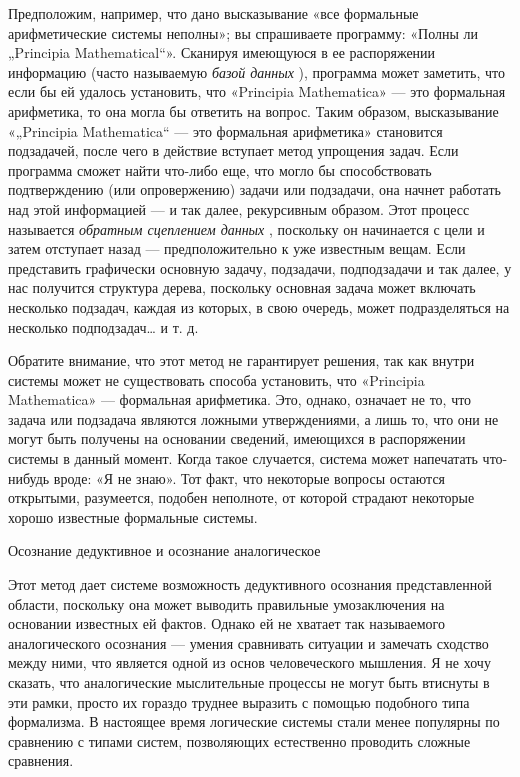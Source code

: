 Предположим, например, что дано высказывание «все формальные арифметические системы неполны»; вы спрашиваете программу: «Полны ли „Principia Mathematical``». Сканируя имеющуюся в ее распоряжении информацию (часто называемую \emph{базой данных} ), программа может заметить, что если бы ей удалось установить, что «Principia Mathematica» --- это формальная арифметика, то она могла бы ответить на вопрос. Таким образом, высказывание «„Principia Mathematica`` --- это формальная арифметика» становится подзадачей, после чего в действие вступает метод упрощения задач. Если программа сможет найти что-либо еще, что могло бы способствовать подтверждению (или опровержению) задачи или подзадачи, она начнет работать над этой информацией --- и так далее, рекурсивным образом. Этот процесс называется \emph{обратным сцеплением данных} , поскольку он начинается с цели и затем отступает назад --- предположительно к уже известным вещам. Если представить графически основную задачу, подзадачи, подподзадачи и так далее, у нас получится структура дерева, поскольку основная задача может включать несколько подзадач, каждая из которых, в свою очередь, может подразделяться на несколько подподзадач\ldots{} и т. д.

Обратите внимание, что этот метод не гарантирует решения, так как внутри системы может не существовать способа установить, что «Principia Mathematica» --- формальная арифметика. Это, однако, означает не то, что задача или подзадача являются ложными утверждениями, а лишь то, что они не могут быть получены на основании сведений, имеющихся в распоряжении системы в данный момент. Когда такое случается, система может напечатать что-нибудь вроде: «Я не знаю». Тот факт, что некоторые вопросы остаются открытыми, разумеется, подобен неполноте, от которой страдают некоторые хорошо известные формальные системы.

Осознание дедуктивное и осознание аналогическое

Этот метод дает системе возможность дедуктивного осознания представленной области, поскольку она может выводить правильные умозаключения на основании известных ей фактов. Однако ей не хватает так называемого аналогического осознания --- умения сравнивать ситуации и замечать сходство между ними, что является одной из основ человеческого мышления. Я не хочу сказать, что аналогические мыслительные процессы не могут быть втиснуты в эти рамки, просто их гораздо труднее выразить с помощью подобного типа формализма. В настоящее время логические системы стали менее популярны по сравнению с типами систем, позволяющих естественно проводить сложные сравнения.

